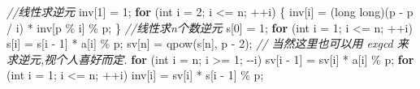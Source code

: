 \documentclass[
]{article}
\newenvironment{Shaded}{}{}
\newcommand{\CommentTok}[1]{\textcolor[rgb]{0.38,0.63,0.69}{\textit{#1}}}
\newcommand{\ControlFlowTok}[1]{\textcolor[rgb]{0.00,0.44,0.13}{\textbf{#1}}}
\newcommand{\DataTypeTok}[1]{\textcolor[rgb]{0.56,0.13,0.00}{#1}}
\newcommand{\DecValTok}[1]{\textcolor[rgb]{0.25,0.63,0.44}{#1}}
\newcommand{\NormalTok}[1]{#1}
\newcommand{\OperatorTok}[1]{\textcolor[rgb]{0.40,0.40,0.40}{#1}}
\begin{document}
\begin{Shaded}
\begin{Highlighting}[]
\CommentTok{//线性求逆元}
\NormalTok{inv}\OperatorTok{[}\DecValTok{1}\OperatorTok{]} \OperatorTok{=} \DecValTok{1}\OperatorTok{;}
\ControlFlowTok{for} \OperatorTok{(}\DataTypeTok{int}\NormalTok{ i }\OperatorTok{=} \DecValTok{2}\OperatorTok{;}\NormalTok{ i }\OperatorTok{\textless{}=}\NormalTok{ n}\OperatorTok{;} \OperatorTok{++}\NormalTok{i}\OperatorTok{)} \OperatorTok{\{}
\NormalTok{  inv}\OperatorTok{[}\NormalTok{i}\OperatorTok{]} \OperatorTok{=} \OperatorTok{(}\DataTypeTok{long} \DataTypeTok{long}\OperatorTok{)(}\NormalTok{p }\OperatorTok{{-}}\NormalTok{ p }\OperatorTok{/}\NormalTok{ i}\OperatorTok{)} \OperatorTok{*}\NormalTok{ inv}\OperatorTok{[}\NormalTok{p }\OperatorTok{\%}\NormalTok{ i}\OperatorTok{]} \OperatorTok{\%}\NormalTok{ p}\OperatorTok{;}
\OperatorTok{\}}
\CommentTok{//线性求n个数逆元}
\NormalTok{s}\OperatorTok{[}\DecValTok{0}\OperatorTok{]} \OperatorTok{=} \DecValTok{1}\OperatorTok{;}
\ControlFlowTok{for} \OperatorTok{(}\DataTypeTok{int}\NormalTok{ i }\OperatorTok{=} \DecValTok{1}\OperatorTok{;}\NormalTok{ i }\OperatorTok{\textless{}=}\NormalTok{ n}\OperatorTok{;} \OperatorTok{++}\NormalTok{i}\OperatorTok{)}\NormalTok{ s}\OperatorTok{[}\NormalTok{i}\OperatorTok{]} \OperatorTok{=}\NormalTok{ s}\OperatorTok{[}\NormalTok{i }\OperatorTok{{-}} \DecValTok{1}\OperatorTok{]} \OperatorTok{*}\NormalTok{ a}\OperatorTok{[}\NormalTok{i}\OperatorTok{]} \OperatorTok{\%}\NormalTok{ p}\OperatorTok{;}
\NormalTok{sv}\OperatorTok{[}\NormalTok{n}\OperatorTok{]} \OperatorTok{=}\NormalTok{ qpow}\OperatorTok{(}\NormalTok{s}\OperatorTok{[}\NormalTok{n}\OperatorTok{],}\NormalTok{ p }\OperatorTok{{-}} \DecValTok{2}\OperatorTok{);}
\CommentTok{// 当然这里也可以用 exgcd 来求逆元,视个人喜好而定.}
\ControlFlowTok{for} \OperatorTok{(}\DataTypeTok{int}\NormalTok{ i }\OperatorTok{=}\NormalTok{ n}\OperatorTok{;}\NormalTok{ i }\OperatorTok{\textgreater{}=} \DecValTok{1}\OperatorTok{;} \OperatorTok{{-}{-}}\NormalTok{i}\OperatorTok{)}\NormalTok{ sv}\OperatorTok{[}\NormalTok{i }\OperatorTok{{-}} \DecValTok{1}\OperatorTok{]} \OperatorTok{=}\NormalTok{ sv}\OperatorTok{[}\NormalTok{i}\OperatorTok{]} \OperatorTok{*}\NormalTok{ a}\OperatorTok{[}\NormalTok{i}\OperatorTok{]} \OperatorTok{\%}\NormalTok{ p}\OperatorTok{;}
\ControlFlowTok{for} \OperatorTok{(}\DataTypeTok{int}\NormalTok{ i }\OperatorTok{=} \DecValTok{1}\OperatorTok{;}\NormalTok{ i }\OperatorTok{\textless{}=}\NormalTok{ n}\OperatorTok{;} \OperatorTok{++}\NormalTok{i}\OperatorTok{)}\NormalTok{ inv}\OperatorTok{[}\NormalTok{i}\OperatorTok{]} \OperatorTok{=}\NormalTok{ sv}\OperatorTok{[}\NormalTok{i}\OperatorTok{]} \OperatorTok{*}\NormalTok{ s}\OperatorTok{[}\NormalTok{i }\OperatorTok{{-}} \DecValTok{1}\OperatorTok{]} \OperatorTok{\%}\NormalTok{ p}\OperatorTok{;}
\end{Highlighting}
\end{Shaded}
\end{document}
